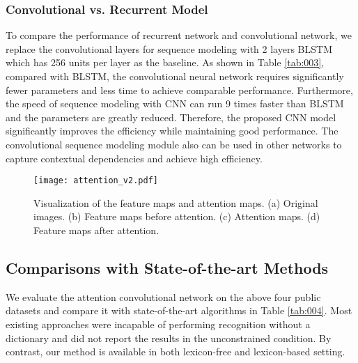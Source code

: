\documentclass[letterpaper]{article} %
\begin{document}
\subsubsection{Convolutional vs. Recurrent Model}
To compare the performance of recurrent network and convolutional network, we replace the convolutional layers for sequence modeling with 2 layers BLSTM which has 256 units per layer as the baseline. As shown in Table \ref{tab:003}, compared with BLSTM, the convolutional neural network requires significantly fewer parameters and less time to achieve comparable performance. Furthermore, the speed of sequence modeling with CNN can run 9 times faster than BLSTM and the parameters are greatly reduced. Therefore, the proposed CNN model significantly improves the efficiency while maintaining good performance. The convolutional sequence modeling module also can be used in other networks to capture contextual dependencies and achieve high efficiency. \par

\begin{figure}
\centering
\texttt{[image: attention\_v2.pdf]}
\caption{Visualization of the feature maps and attention maps. (a) Original images. (b) Feature maps before attention. (c) Attention maps. (d) Feature maps after attention.}
\label{fig:picture003}
\end{figure}





\subsection{Comparisons with State-of-the-art Methods}


We evaluate the attention convolutional network on the above four public datasets and compare it with state-of-the-art algorithms in Table \ref{tab:004}. Most existing approaches were incapable of performing recognition without a dictionary and did not report the results in the unconstrained condition. By contrast, our method is available in both lexicon-free and lexicon-based setting.
\end{document}
